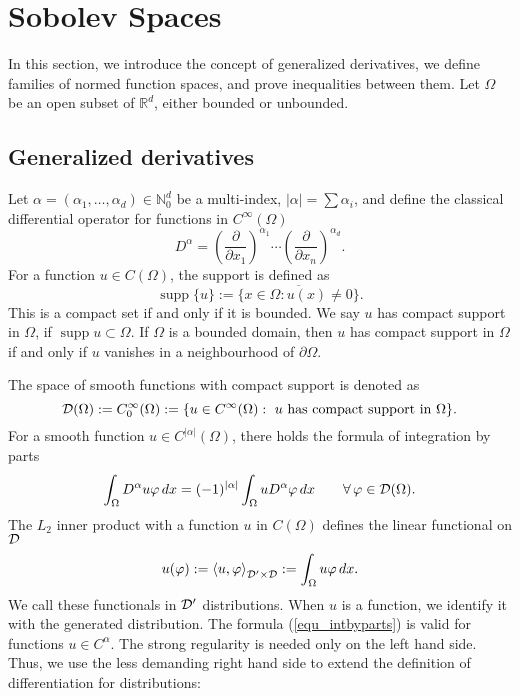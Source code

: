\chapter{Sobolev Spaces}
\label{sec_sobolev}
%
In this section, we introduce the concept of generalized derivatives, we
define families of normed function spaces, and prove inequalities between
them.
Let $\Omega$ be an open subset of ${\mathbb R}^d$, either bounded or unbounded.






\section{Generalized derivatives}

Let $\alpha = (\alpha_1, \ldots , \alpha_d) \in {\mathbb N}_0^d$ be a multi-index,
$| \alpha | = \sum \alpha_i$, 
and define the classical differential operator for functions in $C^\infty (\Omega)$
$$
D^\alpha = 
        \left( \frac{\partial}{\partial x_1} \right)^{\alpha_1} \cdots
        \left( \frac{\partial}{\partial x_n} \right)^{\alpha_d}.
$$
%
For a function $u \in C(\Omega)$, the support is defined as 
$$
\operatorname{supp} \{ u \} := \overline{ \{ x \in \Omega : u(x) \neq 0 \} }.
$$
This is a compact set if and only if it is bounded. We say $u$ has
compact support in $\Omega$, if $\operatorname{supp} u \subset \Omega$.
If $\Omega$ is a bounded domain, then $u$ has compact support in $\Omega$
if and only if $u$ vanishes in a neighbourhood of $\partial \Omega$.

\medskip
\noindent
The space of smooth functions with compact support is denoted as
\begin{equation}
{\cal D} (\Omega) := C_0^\infty (\Omega) := 
\{ u \in C^\infty(\Omega) : \mbox{ $u$ has compact support in $\Omega$} \}.
\end{equation}
%
For a smooth function $u \in C^{|\alpha|}(\Omega)$, there holds the
formula of integration by parts
\begin{equation} \label{equ_intbyparts}
\int_\Omega D^\alpha u \varphi \, dx = (-1)^{|\alpha|} \int_\Omega u D^\alpha \varphi \, dx 
\qquad \forall \, \varphi \in {\cal D}(\Omega).
\end{equation}
The $L_2$ inner product with a function $u$ in $C(\Omega)$ defines the linear
functional on ${\cal D}$
$$
u(\varphi) := \left< u, \varphi \right>_{{\cal D}^\prime \times {\cal D}} := \int_\Omega u \varphi \, dx.
$$
We call these functionals in ${\cal D}^\prime$ distributions.
When $u$ is a function, we identify it with the generated distribution.
The formula (\ref{equ_intbyparts}) is valid for functions $u \in C^\alpha$.
The strong regularity is needed only on the left hand side. Thus, we use
the less demanding right hand side to extend the definition of differentiation
for distributions:

